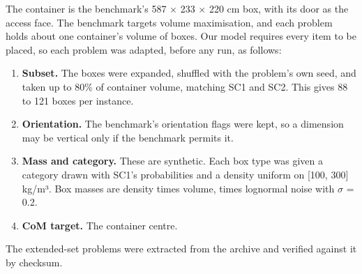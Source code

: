 \documentclass[journal]{IEEEtran}
\providecommand{\tightlist}{\setlength{\itemsep}{0pt}\setlength{\parskip}{0pt}}
\begin{document}
The container is the benchmark's 587 \(\times\) 233 \(\times\) 220 cm box, with its door as the access face. The benchmark targets volume maximisation, and each problem holds about one container's volume of boxes. Our model requires every item to be placed, so each problem was adapted, before any run, as follows:

\begin{enumerate}
\def\labelenumi{\arabic{enumi}.}
\tightlist
\item
  \textbf{Subset.} The boxes were expanded, shuffled with the problem's own seed, and taken up to 80\% of container volume, matching SC1 and SC2. This gives 88 to 121 boxes per instance.
\item
  \textbf{Orientation.} The benchmark's orientation flags were kept, so a dimension may be vertical only if the benchmark permits it.
\item
  \textbf{Mass and category.} These are synthetic. Each box type was given a category drawn with SC1's probabilities and a density uniform on {[}100, 300{]} kg/m³. Box masses are density times volume, times lognormal noise with \(\sigma\) = 0.2.
\item
  \textbf{CoM target.} The container centre.
\end{enumerate}

The extended-set problems were extracted from the archive and verified against it by checksum.
\end{document}
